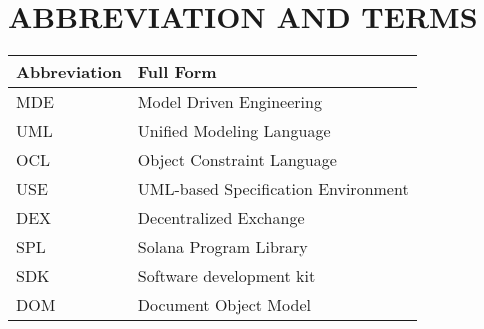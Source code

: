 \chapter*{ABBREVIATION AND TERMS}

\begin{longtable}{|>{\raggedright\arraybackslash}p{4cm}|>{\raggedright\arraybackslash}p{10cm}|}
  \hline
  \textbf{Abbreviation}       & \textbf{Full Form}           
  \\
  \hline
  MDE                    & Model Driven Engineering  
  \\
  \hline
  UML                    & Unified Modeling Language    
  \\
  \hline
  OCL                    & Object Constraint Language
  \\
  \hline
  USE                    & UML-based Specification Environment
  \\
  \hline
  DEX                    & Decentralized Exchange
  \\
  \hline
  SPL                    & Solana Program Library                
  \\
  \hline
  SDK                    & Software development kit
  \\
  \hline
  DOM                    & Document Object Model 
  \\
  \hline
\end{longtable}